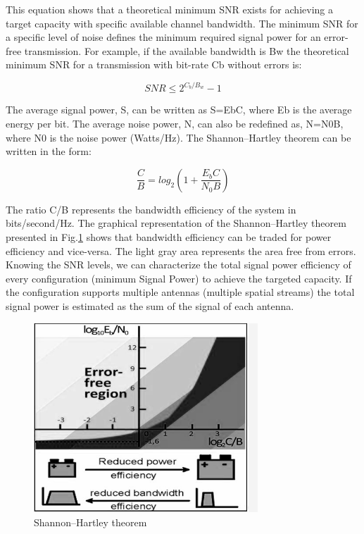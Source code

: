 	This equation shows that a theoretical minimum SNR exists for achieving a target capacity with specific available channel bandwidth. The minimum SNR for a specific level of noise defines the minimum required signal power for an error-free transmission. For example, if the available bandwidth is Bw the theoretical minimum SNR for a transmission with bit-rate Cb without errors is: 

\begin{equation}
SNR \leq 2^{C_{b}/B_{w}} - 1
\end{equation}
	
	The average signal power, S, can be written as S=EbC, where Eb is the average energy per bit. The average noise power, N, can also be redefined as, N=N0B, where N0 is the noise power (Watts/Hz). The Shannon–Hartley theorem \cite{18} can be written in the form:

\begin{equation}
\frac{C}{B} = log_{2}(1 + \frac{E_{b} C}{N_{0} B})
\end{equation}

	The ratio C/B represents the bandwidth efficiency of the system in bits/second/Hz. The graphical representation of the Shannon–Hartley theorem presented in Fig.\ref{fig:F1} shows that bandwidth efficiency can be traded for power efficiency and vice-versa. The light gray area represents the area free from errors. Knowing the SNR levels, we can characterize the total signal power efficiency of every configuration (minimum Signal Power) to achieve the targeted capacity. If the configuration supports multiple antennas (multiple spatial streams) the total signal power is estimated as the sum of the signal of each antenna.
 
 \begin{figure}
\centering
\includegraphics [width=0.75\textwidth]{F/image4.png}
\caption{Shannon–Hartley theorem}
\label{fig:F1}
\end{figure}
 
